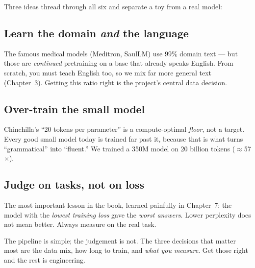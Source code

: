 
\noindent Three ideas thread through all six and separate a toy from a real model:

\subsection{Learn the domain \emph{and} the language}
The famous medical models (Meditron, SaulLM) use 99\% domain text --- but those are \emph{continued}
pretraining on a base that already speaks English. From scratch, you must teach English too, so we mix far
more general text (Chapter~3). Getting this ratio right is the project's central data decision.

\subsection{Over-train the small model}
Chinchilla's ``20 tokens per parameter'' is a compute-optimal \emph{floor}, not a target. Every good small
model today is trained far past it, because that is what turns ``grammatical'' into ``fluent.'' We trained a
350M model on 20 billion tokens ($\approx$57$\times$).

\subsection{Judge on tasks, not on loss}
The most important lesson in the book, learned painfully in Chapter~7: the model with the \emph{lowest training
loss} gave the \emph{worst answers}. Lower perplexity does not mean better. Always measure on the real task.

\begin{lesson}
The pipeline is simple; the judgement is not. The three decisions that matter most are the data mix, how long
to train, and \emph{what you measure}. Get those right and the rest is engineering.
\end{lesson}
